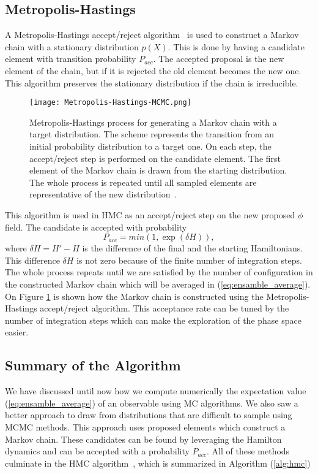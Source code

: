 \subsection{Metropolis-Hastings}

A Metropolis-Hastings accept/reject algorithm~\cite{mhog, mhexpl} is used to construct a Markov chain with a stationary distribution $p(X)$. This is done by having a candidate element with transition probability $P_{acc}$. The accepted proposal is the new element of the chain, but if it is rejected the old element becomes the new one. This algorithm preserves the stationary distribution if the chain is irreducible.

\begin{figure}[htbp]
    \centerline{\texttt{[image: 
        Metropolis-Hastings-MCMC.png]}}
    \caption{Metropolis-Hastings process for generating a Markov chain with a target distribution. The scheme represents the transition from an initial probability distribution to a target one. On each step, the accept/reject step is performed on the candidate element. The first element of the Markov chain is drawn from the starting distribution. The whole process is repeated until all sampled elements are representative of the new distribution~\cite{pic-metro}.
    }
    \label{fig:mn-mcmc}
\end{figure}
This algorithm is used in HMC as an accept/reject step on the new proposed $\phi$ field. The candidate is accepted with probability 
\begin{equation}
    P_{acc} = min(1, \exp(\delta H)),
\end{equation}
where $\delta H = H' - H$ is the difference of the final and the starting Hamiltonians. This difference $\delta H$ is not zero because of the finite number of integration steps. The whole process repeats until we are satisfied by the number of configuration in the constructed Markov chain which will be averaged in (\ref{eq:ensamble_average}). On Figure \ref{fig:mn-mcmc} is shown how the Markov chain is constructed using the Metropolis-Hastings accept/reject algorithm. This acceptance rate can be tuned by the number of integration steps which can make the exploration of the phase space easier.

\subsection{Summary of the Algorithm}

We have discussed until now how we compute numerically the expectation value (\ref{eq:ensamble_average}) of an observable using MC algorithms. We also saw a better approach to draw from distributions that are difficult to sample using MCMC methods. This approach uses proposed elements which construct a Markov chain. These candidates can be found by leveraging the Hamilton dynamics and can be accepted with a probability $P_{acc}$. All of these methods culminate in the HMC algorithm~\cite{hmc}, which is summarized in Algorithm (\ref{alg:hmc})

